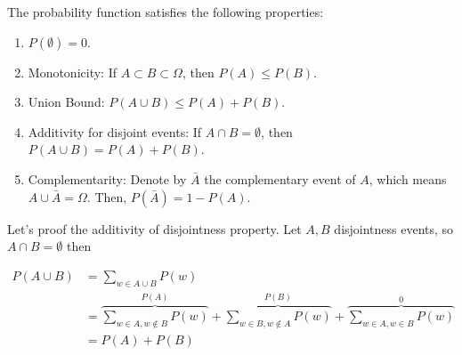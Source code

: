 %
\begin{claim}
The probability function satisfies the following properties:
\begin{enumerate}
  \item $P(\emptyset) = 0$.
  \item Monotonicity: If $A \subset B \subset \Omega$, then $P(A) \le P(B)$.
  \item Union Bound: $P(A \cup B) \le P(A) + P(B)$.
  \item Additivity for disjoint events: If $A\cap B = \emptyset$, then $P(A \cup B) = P(A) + P(B)$.
  \item Complementarity: Denote by $\bar{A}$ the complementary event of $A$, which means $A\cup\bar{A} = \Omega$. Then, $P(\bar{A}) = 1 - P(A)$.
\end{enumerate}
\end{claim}

\begin{example}
  Let's proof the additivity of disjointness property. Let $A,B$ disjointness events, so $A \cap B = \emptyset$ then 
  
  \begin{equation*}
    \begin{split}
      P(A\cup B) &= \sum_{w \in A \cup B}P(w) \\ 
      &= \overbrace{\sum_{w \in A, w \notin{B}}P(w)}^{P(A)} + \overbrace{\sum_{w \in B, w \notin A}P(w)}^{P(B)}  +\overbrace{ \sum_{w \in A, w \in  B}P(w) }^{ 0 } \\ 
      &= P(A) + P(B) 
    \end{split}
  \end{equation*}
\end{example}

